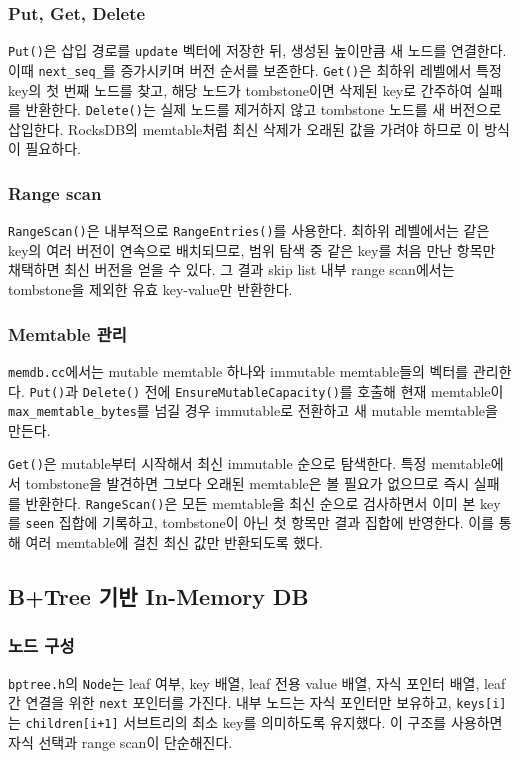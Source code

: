 \documentclass[11pt,a4paper]{article}
\begin{document}
\subsubsection{Put, Get, Delete}
\texttt{Put()}은 삽입 경로를 \texttt{update} 벡터에 저장한 뒤, 생성된 높이만큼 새 노드를 연결한다. 이때 \texttt{next\_seq\_}를 증가시키며 버전 순서를 보존한다. \texttt{Get()}은 최하위 레벨에서 특정 key의 첫 번째 노드를 찾고, 해당 노드가 tombstone이면 삭제된 key로 간주하여 실패를 반환한다. \texttt{Delete()}는 실제 노드를 제거하지 않고 tombstone 노드를 새 버전으로 삽입한다. RocksDB의 memtable처럼 최신 삭제가 오래된 값을 가려야 하므로 이 방식이 필요하다.

\subsubsection{Range scan}
\texttt{RangeScan()}은 내부적으로 \texttt{RangeEntries()}를 사용한다. 최하위 레벨에서는 같은 key의 여러 버전이 연속으로 배치되므로, 범위 탐색 중 같은 key를 처음 만난 항목만 채택하면 최신 버전을 얻을 수 있다. 그 결과 skip list 내부 range scan에서는 tombstone을 제외한 유효 key-value만 반환한다.

\subsubsection{Memtable 관리}
\texttt{memdb.cc}에서는 mutable memtable 하나와 immutable memtable들의 벡터를 관리한다. \texttt{Put()}과 \texttt{Delete()} 전에 \texttt{EnsureMutableCapacity()}를 호출해 현재 memtable이 \texttt{max\_memtable\_bytes}를 넘길 경우 immutable로 전환하고 새 mutable memtable을 만든다.

\texttt{Get()}은 mutable부터 시작해서 최신 immutable 순으로 탐색한다. 특정 memtable에서 tombstone을 발견하면 그보다 오래된 memtable은 볼 필요가 없으므로 즉시 실패를 반환한다. \texttt{RangeScan()}은 모든 memtable을 최신 순으로 검사하면서 이미 본 key를 \texttt{seen} 집합에 기록하고, tombstone이 아닌 첫 항목만 결과 집합에 반영한다. 이를 통해 여러 memtable에 걸친 최신 값만 반환되도록 했다.

\subsection{B+Tree 기반 In-Memory DB}
\subsubsection{노드 구성}
\texttt{bptree.h}의 \texttt{Node}는 leaf 여부, key 배열, leaf 전용 value 배열, 자식 포인터 배열, leaf 간 연결을 위한 \texttt{next} 포인터를 가진다. 내부 노드는 자식 포인터만 보유하고, \texttt{keys[i]}는 \texttt{children[i+1]} 서브트리의 최소 key를 의미하도록 유지했다. 이 구조를 사용하면 자식 선택과 range scan이 단순해진다.
\end{document}

